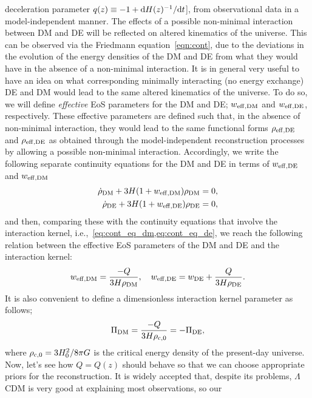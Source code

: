 \documentclass[twocolumn,a4paper,reprint,amssymb,aps,prd,groupedaddress,superscriptaddress,nofootinbib]{revtex4-2}
\begin{document}
deceleration parameter $q(z)\equiv-1+{\rm d}H(z)^{-1}/{\rm d}t$], from observational data in a model-independent
manner. The effects of a possible non-minimal interaction between DM and DE will be reflected on altered
kinematics of the universe. This can be observed via the Friedmann equation~\eqref{eqn:cont}, due to the
deviations in the evolution of the energy densities of the DM and DE from what they would have in the absence
of a non-minimal interaction. It is in general very useful to have an idea on what corresponding minimally
interacting (no energy exchange) DE and DM would lead to the same altered kinematics of the universe. To do so,
we will define \textit{effective} EoS parameters for the DM and DE; $w_{\rm eff, \rm DM}$ and $w_{\rm eff, \rm DE}$,
respectively. These effective parameters are defined such that, in the absence of non-minimal interaction, they
would lead to the same functional forms $\rho_{\rm eff, \rm DE}$ and $\rho_{\rm eff, \rm DE}$ as obtained
through the model-independent reconstruction processes by allowing a possible non-minimal interaction.
Accordingly, we write the following separate continuity equations for the DM and DE in terms of
$w_{\rm eff, \rm DE}$ and $w_{\rm eff, \rm DM}$
%
\begin{align}
    \dot{\rho}_{\rm DM} +3H(1+w_{\rm eff, DM})\rho_{\rm DM} = 0,\\
    \dot{\rho}_{\rm DE} +3H(1+w_{\rm eff, DE})\rho_{\rm DE} = 0,
\end{align}
%
and then, comparing these with the continuity equations that involve the interaction kernel, i.e.,~\cref{eq:cont_eq_dm,eq:cont_eq_de}, we reach the following relation between the effective EoS parameters
of the DM and DE and the interaction kernel:
%
\begin{equation}
    w_{\rm eff, \rm DM} = \frac{-Q}{3H\rho_{\rm DM}}, \quad w_{\rm eff, \rm DE} = w_{\rm DE} + \frac{Q}{3H\rho_{\rm DE}}.
\label{eq:effective_eos}
\end{equation}
%
It is also convenient to define a dimensionless interaction kernel parameter as follows;
%
\begin{equation}
    \Pi_{\rm DM} = \frac{-Q}{3H\rho_{\rm c,0}} = -\Pi_{\rm DE},
\end{equation}
%
where $\rho_{\rm c,0}=3H_0^2/8\pi G$ is the critical energy density of the present-day universe.
Now, let's see how $Q=Q(z)$ should behave so that we can choose appropriate priors for the reconstruction. It is
widely accepted that, despite its problems, $\Lambda$CDM is very good at explaining most observations, so our
\end{document}
